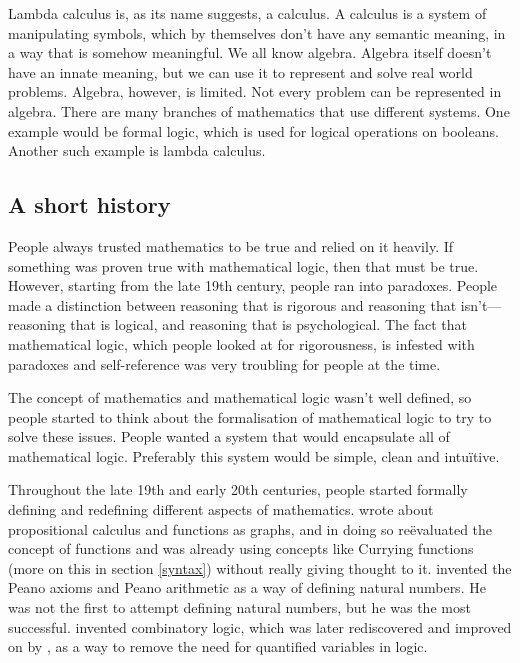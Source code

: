 \documentclass[11pt]{article}
\begin{document}
Lambda calculus is, as its name suggests, a calculus. A calculus is a system of
manipulating symbols, which by themselves don't have any semantic meaning, in a
way that is somehow meaningful. We all know algebra. Algebra itself doesn't
have an innate meaning, but we can use it to represent and solve real world
problems. Algebra, however, is limited. Not every problem can be represented in
algebra. There are many branches of mathematics that use different systems.
One example would be formal logic, which is used for logical operations on
booleans. Another such example is lambda calculus.

\subsection{A short history\label{history}}

People always trusted mathematics to be true and relied on it heavily. If
something was proven true with mathematical logic, then that must be true.
However, starting from the late 19th century, people ran into paradoxes. People
made a distinction between reasoning that is rigorous and reasoning that
isn't---reasoning that is logical, and reasoning that is psychological. The
fact that mathematical logic, which people looked at for rigorousness, is
infested with paradoxes and self-reference was very troubling for people at the
time.

The concept of mathematics and mathematical logic wasn't well defined, so
people started to think about the formalisation of mathematical logic to try to
solve these issues. People wanted a system that would encapsulate all of
mathematical logic. Preferably this system would be simple, clean and
intuïtive.

Throughout the late 19th and early 20th centuries, people started formally
defining and redefining different aspects of mathematics. \textcite{frege1879}
wrote about propositional calculus and functions as graphs, and in doing so
reëvaluated the concept of functions and was already using concepts like
Currying functions (more on this in section \ref{syntax}) without really giving
thought to it. \textcite{peano1889} invented the Peano axioms and Peano
arithmetic as a way of defining natural numbers. He was not the first to
attempt defining natural numbers, but he was the most successful.
\textcite{schonfinkel1924} invented combinatory logic, which was later
rediscovered and improved on by \textcite{curry1930}, as a way to remove the
need for quantified variables in logic.
\end{document}
